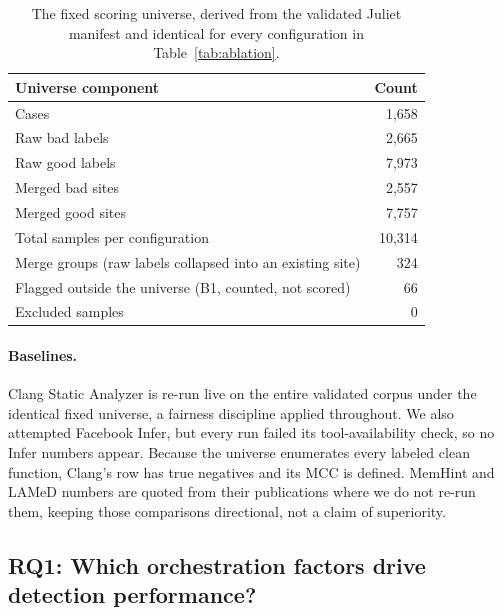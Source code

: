 \documentclass[a4paper]{llncs}
\begin{document}
\begin{table}[htbp]
\centering
\caption{The fixed scoring universe, derived from the validated Juliet
manifest and identical for every configuration in
Table~\ref{tab:ablation}.}
\label{tab:universe}
\footnotesize
\begin{tabular}{@{}lr@{}}
\toprule
\textbf{Universe component} & \textbf{Count} \\
\midrule
Cases & 1{,}658 \\
Raw bad labels & 2{,}665 \\
Raw good labels & 7{,}973 \\
Merged bad sites & 2{,}557 \\
Merged good sites & 7{,}757 \\
Total samples per configuration & 10{,}314 \\
Merge groups (raw labels collapsed into an existing site) & 324 \\
Flagged outside the universe (B1, counted, not scored) & 66 \\
Excluded samples & 0 \\
\bottomrule
\end{tabular}
\end{table}

\paragraph{Baselines.} Clang Static Analyzer is re-run live on the
entire validated corpus under the identical fixed universe, a fairness
discipline
applied throughout. We also attempted Facebook Infer, but every run
failed its tool-availability check, so no Infer numbers appear. Because
the universe enumerates every labeled clean function, Clang's row has
true negatives and its MCC is defined. MemHint and LAMeD numbers are
quoted from their publications where we do not re-run them, keeping
those comparisons directional,
not a claim of superiority.

\subsection{RQ1: Which orchestration factors drive detection performance?}
\label{sec:eval-ablation}
\label{sec:eval-fullcorpus}
\end{document}
